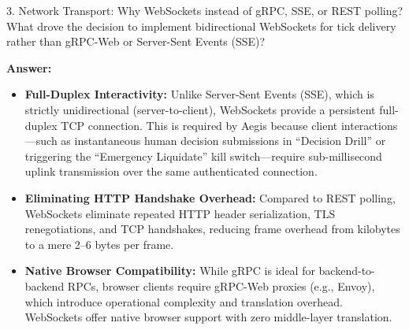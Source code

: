 \documentclass[11pt,a4paper]{article}
\begin{document}
\begin{questionbox}{3. Network Transport: Why WebSockets instead of gRPC, SSE, or REST polling?}
What drove the decision to implement bidirectional WebSockets for tick delivery rather than gRPC-Web or Server-Sent Events (SSE)?
\end{questionbox}
\begin{answerbox}
\textbf{Answer:}
\begin{itemize}[leftmargin=1.5em]
  \item \textbf{Full-Duplex Interactivity:} Unlike Server-Sent Events (SSE), which is strictly unidirectional (server-to-client), WebSockets provide a persistent full-duplex TCP connection. This is required by Aegis because client interactions---such as instantaneous human decision submissions in ``Decision Drill'' or triggering the ``Emergency Liquidate'' kill switch---require sub-millisecond uplink transmission over the same authenticated connection.
  \item \textbf{Eliminating HTTP Handshake Overhead:} Compared to REST polling, WebSockets eliminate repeated HTTP header serialization, TLS renegotiations, and TCP handshakes, reducing frame overhead from kilobytes to a mere 2--6 bytes per frame.
  \item \textbf{Native Browser Compatibility:} While gRPC is ideal for backend-to-backend RPCs, browser clients require gRPC-Web proxies (e.g., Envoy), which introduce operational complexity and translation overhead. WebSockets offer native browser support with zero middle-layer translation.
\end{itemize}
\end{answerbox}

\vspace{0.4em}
\end{document}
